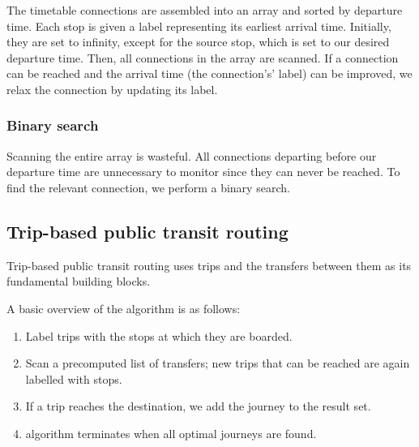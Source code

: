 The timetable connections are assembled into an array and sorted by departure time. Each stop is given a label representing its earliest arrival time. Initially, they are set to infinity, except for the source stop, which is set to our desired departure time. Then, all connections in the array are scanned. If a connection can be reached and the arrival time (the connection's' label) can be improved, we relax the connection by updating its label. 

\subsubsection{Binary search}
Scanning the entire array is wasteful. All connections departing before our departure time are unnecessary to monitor since they can never be reached. To find the relevant connection, we perform a binary search. 
\subsection{Trip-based public transit routing}
Trip-based public transit routing uses trips and the transfers between them as its fundamental building blocks. 

A basic overview of the algorithm is as follows:
\begin{enumerate}
    \item Label trips with the stops at which they are boarded.
    \item Scan a precomputed list of transfers; new trips that can be reached are again labelled with stops.
    \item If a trip reaches the destination, we add the journey to the result set.
    \item algorithm terminates when all optimal journeys are found.
\end{enumerate}
